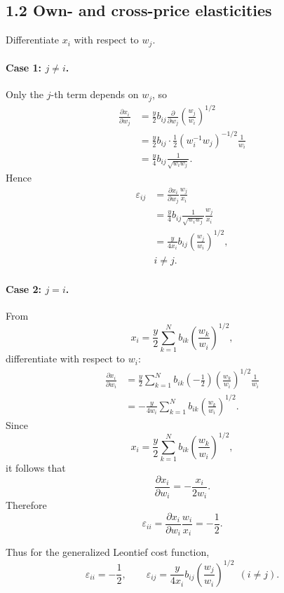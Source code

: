\subsection*{1.2 Own- and cross-price elasticities}

Differentiate \(x_i\) with respect to \(w_j\).

\paragraph{Case 1: \(j\neq i\).}
Only the \(j\)-th term depends on \(w_j\), so
\[
\begin{aligned}
\frac{\partial x_i}{\partial w_j}
&=
\frac{y}{2}b_{ij}\frac{\partial}{\partial w_j}\left(\frac{w_j}{w_i}\right)^{1/2}\\
&=
\frac{y}{2}b_{ij}\cdot \frac{1}{2}(w_i^{-1}w_j)^{-1/2}\frac{1}{w_i}\\
&=
\frac{y}{4}b_{ij}\frac{1}{\sqrt{w_i w_j}}.
\end{aligned}
\]
Hence
\[
\boxed{
\begin{aligned}
\varepsilon_{ij}
&=
\frac{\partial x_i}{\partial w_j}\frac{w_j}{x_i}\\
&=
\frac{y}{4}b_{ij}\frac{1}{\sqrt{w_i w_j}}\frac{w_j}{x_i}\\
&=
\frac{y}{4x_i}b_{ij}\left(\frac{w_j}{w_i}\right)^{1/2},\\
&i\neq j.
\end{aligned}
}
\]

\paragraph{Case 2: \(j=i\).}
From
\[
x_i
=
\frac{y}{2}\sum_{k=1}^N b_{ik}\left(\frac{w_k}{w_i}\right)^{1/2},
\]
differentiate with respect to \(w_i\):
\[
\begin{aligned}
\frac{\partial x_i}{\partial w_i}
&=
\frac{y}{2}\sum_{k=1}^N b_{ik}\left(-\frac{1}{2}\right)\left(\frac{w_k}{w_i}\right)^{1/2}\frac{1}{w_i}\\
&=
-\frac{y}{4w_i}\sum_{k=1}^N b_{ik}\left(\frac{w_k}{w_i}\right)^{1/2}.
\end{aligned}
\]
Since
\[
x_i=\frac{y}{2}\sum_{k=1}^N b_{ik}\left(\frac{w_k}{w_i}\right)^{1/2},
\]
it follows that
\[
\frac{\partial x_i}{\partial w_i}
=
-\frac{x_i}{2w_i}.
\]
Therefore
\[
\boxed{
    \varepsilon_{ii}
    =
    \frac{\partial x_i}{\partial w_i}\frac{w_i}{x_i}
    =
    -\frac{1}{2}.
}
\]

Thus for the generalized Leontief cost function,
\[
\boxed{
\varepsilon_{ii}=-\frac{1}{2},
\qquad
\varepsilon_{ij}
=
\frac{y}{4x_i}b_{ij}\left(\frac{w_j}{w_i}\right)^{1/2}
\ \ (i\neq j).
}
\]

